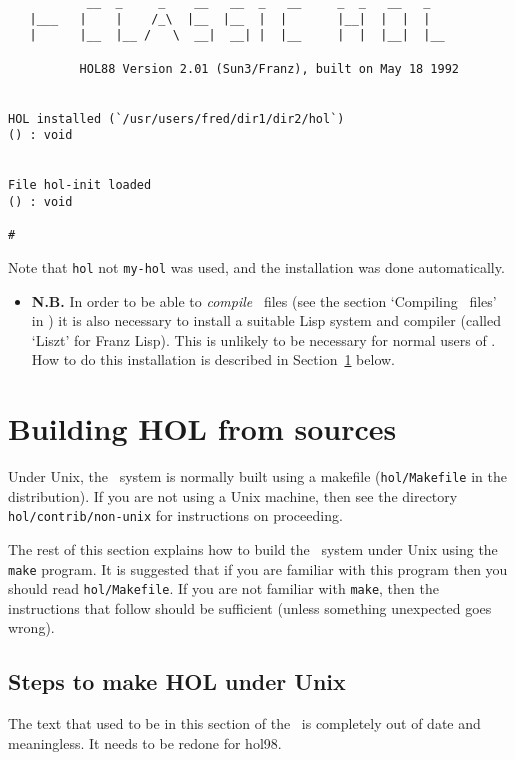 {\begin{session}
\begin{verbatim}
           __  _     _    __   __  _   __     _  _   __   _
   |___   |    |    /_\  |__  |__  |  |       |__|  |  |  |
   |      |__  |__ /   \  __|  __| |  |__     |  |  |__|  |__

          HOL88 Version 2.01 (Sun3/Franz), built on May 18 1992


HOL installed (`/usr/users/fred/dir1/dir2/hol`)
() : void


File hol-init loaded
() : void

#
\end{verbatim}\end{session}

\noindent Note that {\small\tt hol} not {\small\tt my-hol} was used, and the
installation was done automatically.


\begin{itemize}
\item{\bf N.B.} In order to be able to
{\it compile\/} \ML\ files (see the section
`Compiling \ML\ files' in \DESCRIPTION) it is also necessary
to install a suitable Lisp system and compiler (called `Liszt' for Franz Lisp).
This is unlikely to be necessary for normal users of \HOL. How to do this
installation
is described in Section~\ref{build} below.
\end{itemize}

\section{Building HOL from sources}
\label{build}

Under Unix, the \HOL\ system is normally built using a makefile
({\small\tt hol/Makefile} in the distribution).
If you are not using a Unix machine, then see the directory
{\small\tt hol/contrib/non-unix} for instructions on proceeding.


The rest of  this section  explains how  to build  the \HOL\  system under Unix
using the {\small\tt make} program.  It is suggested  that if  you are familiar
with this program then you should  read {\small\tt  hol/Makefile}.   If you are
not familiar with {\small\tt make}, then the instructions that follow should be
sufficient (unless something unexpected goes wrong).

\subsection{Steps to make HOL under Unix}

The text that used to be in this section of the \TUTORIAL\ is
completely out of date and meaningless.  It needs to be redone for
hol98.

}
